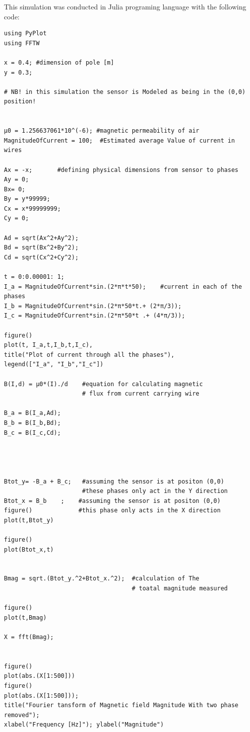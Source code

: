 \documentclass[12pt]{article}
\begin{document}
This simulation was conducted in Julia programing language with the following code:
\begin{lstlisting}
using PyPlot 
using FFTW

x = 0.4; #dimension of pole [m]
y = 0.3;

# NB! in this simulation the sensor is Modeled as being in the (0,0) position!


μ0 = 1.256637061*10^(-6); #magnetic permeability of air
MagnitudeOfCurrent = 100;  #Estimated average Value of current in wires

Ax = -x;       #defining physical dimensions from sensor to phases
Ay = 0;
Bx= 0;
By = y*99999;
Cx = x*99999999;
Cy = 0;

Ad = sqrt(Ax^2+Ay^2);
Bd = sqrt(Bx^2+By^2);
Cd = sqrt(Cx^2+Cy^2);

t = 0:0.00001: 1;
I_a = MagnitudeOfCurrent*sin.(2*π*t*50);    #current in each of the phases
I_b = MagnitudeOfCurrent*sin.(2*π*50*t.+ (2*π/3));
I_c = MagnitudeOfCurrent*sin.(2*π*50*t .+ (4*π/3));

figure()
plot(t, I_a,t,I_b,t,I_c),
title("Plot of current through all the phases"),
legend(["I_a", "I_b","I_c"])

B(I,d) = μ0*(I)./d    #equation for calculating magnetic
                      # flux from current carrying wire

B_a = B(I_a,Ad);
B_b = B(I_b,Bd);
B_c = B(I_c,Cd);




Btot_y= -B_a + B_c;   #assuming the sensor is at positon (0,0)
                      #these phases only act in the Y direction
Btot_x = B_b    ;    #assuming the sensor is at positon (0,0) 
figure()             #this phase only acts in the X direction
plot(t,Btot_y)

figure()
plot(Btot_x,t)


Bmag = sqrt.(Btot_y.^2+Btot_x.^2);  #calculation of The
                                    # toatal magnitude measured

figure()
plot(t,Bmag)

X = fft(Bmag);


figure()
plot(abs.(X[1:500]))
figure()
plot(abs.(X[1:500])); 
title("Fourier tansform of Magnetic field Magnitude With two phase removed"); 
xlabel("Frequency [Hz]"); ylabel("Magnitude")


\end{lstlisting}
\end{document}
